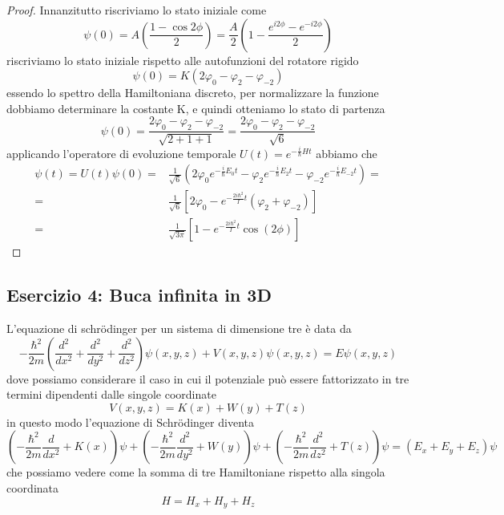 \begin{proof}
	Innanzitutto riscriviamo lo stato iniziale come
	\begin{equation*}
		\psi(0) = A \left( \frac{1-\cos 2\phi}{2} \right) = \frac{A}{2} \left( 1 - \frac{e^{i2\phi} - e^{-i2\phi}}{2}\right)
	\end{equation*} 
riscriviamo lo stato iniziale rispetto alle autofunzioni del rotatore rigido
\begin{equation*}
	\psi(0) = K (2\varphi_0 - \varphi_{2} - \varphi_{-2} )
\end{equation*}
essendo lo spettro della Hamiltoniana discreto, per normalizzare la funzione dobbiamo determinare la costante K, e quindi otteniamo lo stato di partenza 
\begin{equation*}
	\psi(0) = \frac{2\varphi_0 - \varphi_{2} - \varphi_{-2}}{\sqrt{2+1+1}} = \frac{2\varphi_0 - \varphi_{2} - \varphi_{-2}}{\sqrt{6}} 
\end{equation*}
applicando l'operatore di evoluzione temporale $U(t) = e^{- \frac{i}{\hbar}Ht}$ abbiamo che 
\begin{align*}
	\psi(t) = U(t) \psi(0) = & \frac{1}{\sqrt{6}}(2\varphi_0e^{- \frac{i}{\hbar}E_0t} - \varphi_{2}e^{-\frac{i}{\hbar}E_2t} - \varphi_{-2}e^{-\frac{i}{\hbar}E_{-2}t})= \\[0.5cm]
	= & \frac{1}{\sqrt{6}}[2\varphi_0 - e^{-\frac{2 i\hbar^2}{I}t}(\varphi_{2} + \varphi_{-2})] \\[0.5cm]
	= & \frac{1}{\sqrt{3 \pi}}[1 - e^{-\frac{2i \hbar^2}{I}t}\cos(2\phi)]
\end{align*}

\end{proof}

\subsection{Esercizio 4: Buca infinita in 3D}

L'equazione di schr\"odinger per un sistema di dimensione tre \`e data da
\begin{equation*}
	- \frac{\hbar^2}{2m	} \left ( \frac{d^2}{dx^2} + \frac{d^2}{dy^2} + \frac{d^2}{dz^2}\right)\psi(x,y,z) + V(x,y,z)\psi(x,y,z) = E\psi(x,y,z)
\end{equation*}
dove possiamo considerare il caso in cui il potenziale pu\`o essere fattorizzato in tre termini dipendenti dalle singole coordinate
\begin{equation*}
	V(x,y,z) = K(x) + W(y) +T(z)
\end{equation*}
in questo modo l'equazione di Schr\"odinger diventa
\begin{equation*}
	\left (-\frac{\hbar^2}{2m} \frac{d}{dx^2} +K(x)\right)\psi  + \left( -\frac{\hbar^2}{2m} \frac{d^2}{dy^2} +W(y)\right)\psi + \left( -\frac{\hbar^2}{2m}\frac{d^2}{dz^2} +T(z)\right)\psi = (E_x+E_y +E_z)\psi
\end{equation*}
che possiamo vedere come la somma di tre Hamiltoniane rispetto alla singola coordinata
\begin{equation*}
	H = H_x + H_y + H_z
\end{equation*}

